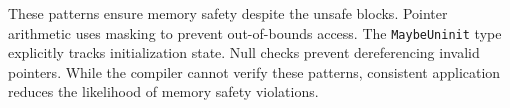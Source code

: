 These patterns ensure memory safety despite the unsafe blocks. Pointer arithmetic uses masking to prevent out-of-bounds access. The \texttt{MaybeUninit} type explicitly tracks initialization state. Null checks prevent dereferencing invalid pointers. While the compiler cannot verify these patterns, consistent application reduces the likelihood of memory safety violations.